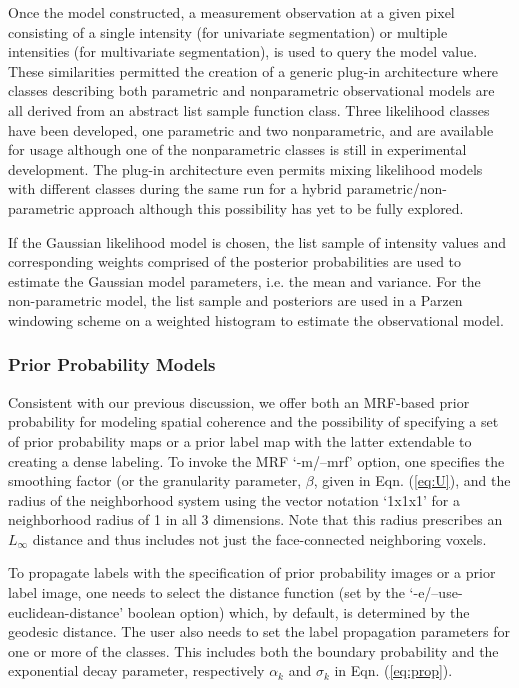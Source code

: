 \documentclass[11pt,english]{article}
\begin{document}
Once the model constructed, a measurement
observation at a given pixel consisting of a single intensity (for univariate segmentation) or multiple intensities (for multivariate
segmentation), is used to query the model value.  These similarities permitted the creation of a generic plug-in architecture
where classes describing both parametric and nonparametric  observational models are all derived from an abstract 
list sample function class.   Three likelihood classes have been developed, one parametric and two nonparametric,
and are available for usage although one of the nonparametric classes is still in experimental development.  The plug-in architecture even permits mixing likelihood models with different classes during the same run for a hybrid parametric/non-parametric approach although this possibility has yet to be fully explored.

If the Gaussian likelihood model is chosen, the list sample of intensity values and 
corresponding weights comprised of the posterior probabilities are used to estimate the Gaussian model parameters, i.e.
the mean and variance.  For the non-parametric model, the list sample and posteriors are used
in a Parzen windowing scheme on a weighted histogram to estimate the observational model.  

\subsubsection{Prior Probability Models}
Consistent with our previous discussion, we offer both an MRF-based prior probability for modeling spatial coherence and the possibility of specifying a set of prior probability maps or a prior label map with the latter extendable to creating a dense labeling.  To invoke the MRF `{\ttfamily -m/--mrf}' option, one specifies the smoothing factor (or the granularity parameter, $\beta$, given in Eqn. (\ref{eq:U}), and the radius of the neighborhood system using the vector notation `{\ttfamily 1x1x1}' for a neighborhood radius of 1 in all 3 dimensions.  Note that this radius prescribes an $L_\infty$ distance and thus includes not just the face-connected neighboring voxels.

To propagate labels with the specification of prior probability images or a prior label image, one needs to select the distance function (set by the `{\ttfamily -e/--use-euclidean-distance}' boolean option) which, by default, is determined by the geodesic distance.  The user also needs to set the label propagation parameters for one or more of the classes.  This  includes both the boundary probability and the exponential decay parameter, respectively $\alpha_k$ and $\sigma_k$ in Eqn. (\ref{eq:prop}).  
\end{document}
